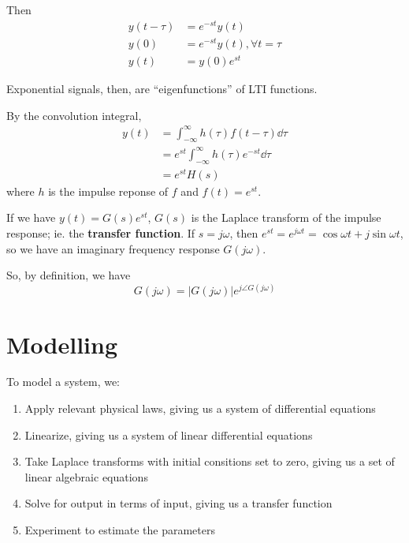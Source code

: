\documentclass[12pt]{article}
\begin{document}
Then
\begin{align*}
y(t-\tau) &= e^{-st}y(t) \\
y(0) &= e^{-st} y(t), \forall t = \tau \\
y(t) &= y(0)e^{st}
\end{align*}

Exponential signals, then, are ``eigenfunctions'' of LTI functions.

By the convolution integral,
\begin{align*}
y(t) &= \int_{-\infty}^\infty h(\tau) f(t-\tau) \dd\tau \\
&= e^{st} \int_{-\infty}^\infty h(\tau) e^{-st} \dd\tau \\
&= e^{st} H(s)
\end{align*}
where $h$ is the impulse reponse of $f$ and $f(t) = e^{st}$.

If we have $y(t) = G(s)e^{st}$, $G(s)$ is the Laplace transform of the impulse response; ie. the {\bf transfer function}. If $s = j\omega$, then $e^{st} = e^{j\omega t} = \cos\omega t + j\sin\omega t$, so we have an imaginary frequency response $G(j\omega)$.

So, by definition, we have \[ G(j\omega) = \bigl| G(j\omega) \bigl| e^{j\angle G(j\omega)} \]

\section{Modelling}
To model a system, we:
\begin{enumerate}
\item Apply relevant physical laws, giving us a system of differential equations
\item Linearize, giving us a system of linear differential equations
\item Take Laplace transforms with initial consitions set to zero, giving us a set of linear algebraic equations
\item Solve for output in terms of input, giving us a transfer function
\item Experiment to estimate the parameters
\end{enumerate}
\end{document}
